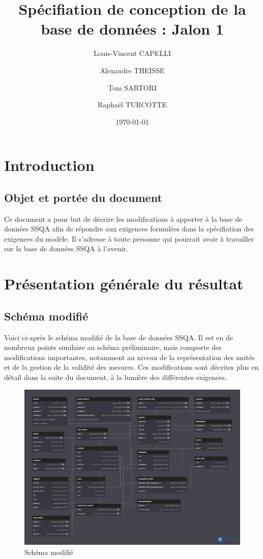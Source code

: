 \documentclass{article}
\begin{document}
\title{Spécifiation de conception de la base de données : Jalon 1}

\author{Louis-Vincent CAPELLI \and Alexandre THEISSE \and Tom SARTORI \and Raphaël TURCOTTE}
\date{\today}
\maketitle
\newpage

\tableofcontents
\newpage

\section{Introduction}
\subsection*{Objet et portée du document}
Ce document a pour but de décrire les modifications à apporter à la base de données
SSQA afin de répondre aux exigences formulées dans la
spécifiation des exigences du modèle.
Il s'adresse à toute personne qui pourrait avoir à travailler sur la base de données
SSQA à l'avenir.

\section{Présentation générale du résultat}
\subsection{Schéma modifié}
Voici ci-après le schéma modifié de la base de données SSQA. Il est en de
nombreux points similaire au schéma préliminaire, mais comporte des modifications
importantes, notamment au niveau de la représentation des unités et de la gestion
de la validité des mesures. Ces modifications sont décrites plus en détail dans
la suite du document, à la lumière des différentes exigences.

\begin{figure}[h]
\centering
\caption{Schéma modifié}
\includegraphics[scale=0.24]{modif.png}
\end{figure}
\end{document}
